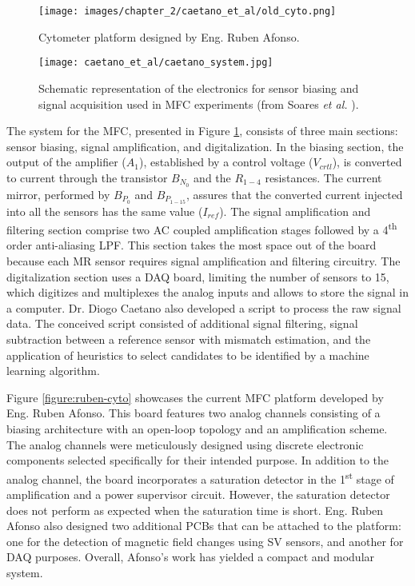 
\begin{figure}[!ht]
    \centering
    \begin{minipage}{0.38\textwidth}
        \centering
        \texttt{[image: images/chapter\_2/caetano\_et\_al/old\_cyto.png]}
        \caption{Cytometer platform designed by Eng. Ruben Afonso.}
        \label{figure:ruben-cyto}
    \end{minipage}\hfill
    \begin{minipage}{0.58\textwidth}
        \centering
        \texttt{[image: caetano\_et\_al/caetano\_system.jpg]}
        \caption{Schematic representation of the electronics for sensor biasing and signal acquisition used in MFC experiments (from Soares \textit{et al.} \cite{Soares2019}).}
        \label{figure:caetano-schematic-mfc}
    \end{minipage}
\end{figure}

The system for the \ac{MFC}, presented in Figure \ref{figure:caetano-schematic-mfc}, consists of three main sections: sensor biasing, signal amplification, and digitalization. In the biasing section, the output of the amplifier ($A_1$), established by a control voltage ($V_{crtl}$), is converted to current through the transistor $B_{N_0}$ and the $R_{1-4}$ resistances. The current mirror, performed by $B_{P_0}$ and $B_{P_{1-15}}$, assures that the converted current injected into all the sensors has the same value ($I_{ref}$). The signal amplification and filtering section comprise two \ac{AC} coupled amplification stages followed by a 4\textsuperscript{th} order anti-aliasing \ac{LPF}. This section takes the most space out of the board because each \ac{MR} sensor requires signal amplification and filtering circuitry. The digitalization section uses a \ac{DAQ} board, limiting the number of sensors to 15, which digitizes and multiplexes the analog inputs and allows to store the signal in a computer. Dr. Diogo Caetano also developed a script to process the raw signal data. The conceived script consisted of additional signal filtering, signal subtraction between a reference sensor with mismatch estimation, and the application of heuristics to select candidates to be identified by a machine learning algorithm.

Figure \ref{figure:ruben-cyto} showcases the current \ac{MFC} platform developed by Eng. Ruben Afonso. This board features two analog channels consisting of a biasing architecture with an open-loop topology and an amplification scheme. The analog channels were meticulously designed using discrete electronic components selected specifically for their intended purpose. In addition to the analog channel, the board incorporates a saturation detector in the 1\textsuperscript{st} stage of amplification and a power supervisor circuit. However, the saturation detector does not perform as expected when the saturation time is short. Eng. Ruben Afonso also designed two additional \ac{PCB}s that can be attached to the platform: one for the detection of magnetic field changes using \ac{SV} sensors, and another for \ac{DAQ} purposes. Overall, Afonso's work has yielded a compact and modular system.

